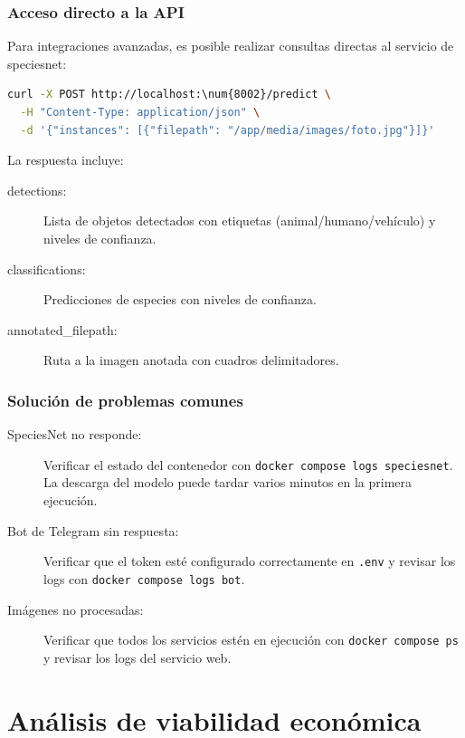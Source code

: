 \documentclass[a4paper, 12pt]{report}
\begin{document}
\subsection{Acceso directo a la API}

Para integraciones avanzadas, es posible realizar consultas directas
al servicio de \gls{speciesnet}:

\begin{lstlisting}[language=bash, caption={Ejemplo de consulta directa a la API de SpeciesNet.}]
  curl -X POST http://localhost:\num{8002}/predict \
  -H "Content-Type: application/json" \
  -d '{"instances": [{"filepath": "/app/media/images/foto.jpg"}]}'
\end{lstlisting}

La respuesta incluye:

\begin{description}
  \item[detections:] Lista de objetos detectados con etiquetas
    (animal/humano/vehículo) y niveles de confianza.
  \item[classifications:] Predicciones de especies con niveles
    de confianza.
  \item[annotated\_filepath:] Ruta a la imagen anotada con
    cuadros delimitadores.
\end{description}

\subsection{Solución de problemas comunes}

\begin{description}
  \item[SpeciesNet no responde:] Verificar el estado del contenedor
    con \lstinline[language=bash]{docker compose logs speciesnet}.
    La descarga del modelo puede tardar varios minutos en la primera
    ejecución.
  \item[Bot de Telegram sin respuesta:] Verificar que el token
    esté configurado correctamente en \texttt{.env} y revisar
    los logs con \lstinline[language=bash]{docker compose logs bot}.
  \item[Imágenes no procesadas:] Verificar que todos los servicios
    estén en ejecución con \lstinline[language=bash]{docker compose ps}
    y revisar los logs del servicio web.
\end{description}

\chapter{Análisis de viabilidad económica}
\end{document}

